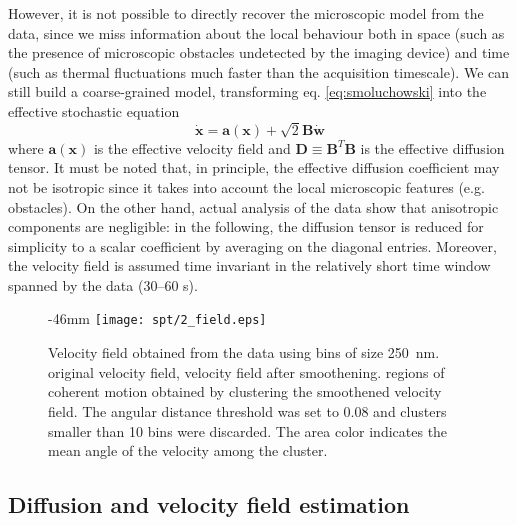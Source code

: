 However, it is not possible to directly recover the microscopic model from the  data, since we miss information about the local behaviour both in space (such as the presence of microscopic obstacles undetected by the imaging device) and time (such as thermal fluctuations much faster than the acquisition timescale). We can still build a coarse-grained model, transforming eq. \ref{eq:smoluchowski} into the effective stochastic equation
\begin{equation} \label{eq:effective}
 \dot{\bm{x}} = \bm{a}(\bm{x}) + \sqrt{2}\bm{B} \dot{\bm{w}}
\end{equation}
where $\bm{a}(\bm{x})$ is the effective velocity field and $\bm{D} \equiv \bm{B}^T\bm{B}$ is the effective diffusion tensor. It must be noted that, in principle, the effective diffusion coefficient may not be isotropic since it takes into account the local microscopic features (e.g. obstacles). On the other hand, actual analysis of the data show that anisotropic components are negligible: in the following, the diffusion tensor is reduced for simplicity to a scalar coefficient by averaging on the diagonal entries. Moreover, the velocity field is assumed time invariant in the relatively short time window spanned by the  data (30--60 s).

\begin{figure}
    \begin{adjustwidth*}{}{-46mm}
      \texttt{[image: spt/2\_field.eps]}%
      {{\label{fig:vf_original}}%
      {\label{fig:vf_smooth}}%
      {\label{fig:vf_cdr}}}%
      \caption{Velocity field obtained from the  data using bins of size \SI{250}{\nano\metre}. \enskip original velocity field, \enskip velocity field after smoothening. \enskip regions of coherent motion obtained by clustering the smoothened velocity field. The angular distance threshold was set to \SI{0.08}{} and clusters smaller than 10 bins were discarded. The area color indicates the mean angle of the velocity among the cluster.\label{fig:vf}}
  \end{adjustwidth*}
\end{figure}


\subsection{Diffusion and velocity field estimation}

